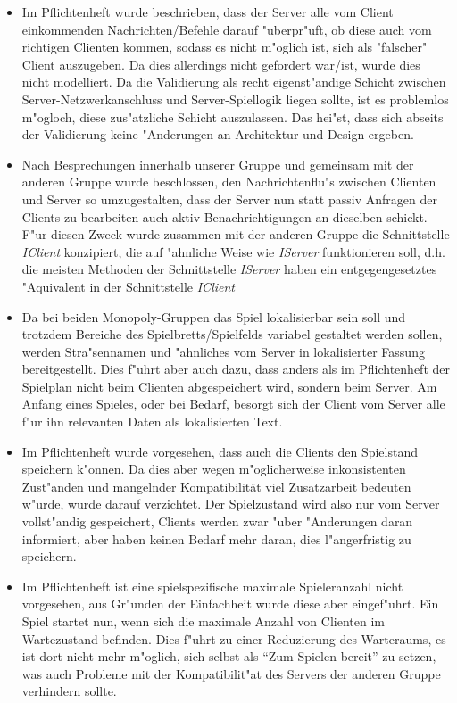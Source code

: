 \documentclass[a4paper,10pt]{article}
\begin{document}
\begin{itemize}
\item Im Pflichtenheft wurde beschrieben, dass der Server alle vom Client einkommenden Nachrichten/Befehle darauf "uberpr"uft, ob diese auch vom richtigen Clienten kommen, sodass es nicht m"oglich ist, sich als "falscher" Client auszugeben. Da dies allerdings nicht gefordert war/ist, wurde dies nicht modelliert. Da die Validierung als recht eigenst"andige Schicht zwischen Server-Netzwerkanschluss und Server-Spiellogik liegen sollte, ist es problemlos m"ogloch, diese zus"atzliche Schicht auszulassen. Das hei"st, dass sich abseits der Validierung keine "Anderungen an Architektur und Design ergeben.
\item Nach Besprechungen innerhalb unserer Gruppe und gemeinsam mit der anderen Gruppe wurde beschlossen, den Nachrichtenflu"s zwischen Clienten und Server so umzugestalten, dass der Server nun statt passiv Anfragen der Clients zu bearbeiten auch aktiv Benachrichtigungen an dieselben schickt. F"ur diesen Zweck wurde zusammen mit der anderen Gruppe die Schnittstelle \textit{IClient} konzipiert, die auf "ahnliche Weise wie \textit{IServer} funktionieren soll, d.h. die meisten Methoden der Schnittstelle \textit{IServer} haben ein entgegengesetztes "Aquivalent in der Schnittstelle \textit{IClient}
\item Da bei beiden Monopoly-Gruppen das Spiel lokalisierbar sein soll und trotzdem Bereiche des Spielbretts/Spielfelds variabel gestaltet werden sollen, werden Stra"sennamen und "ahnliches vom Server in lokalisierter Fassung bereitgestellt. Dies f"uhrt aber auch dazu, dass anders als im Pflichtenheft der Spielplan nicht beim Clienten abgespeichert wird, sondern beim Server. Am Anfang eines Spieles, oder bei Bedarf, besorgt sich der Client vom Server alle f"ur ihn relevanten Daten als lokalisierten Text.
\item Im Pflichtenheft wurde vorgesehen, dass auch die Clients den Spielstand speichern k"onnen. Da dies aber wegen m"oglicherweise inkonsistenten Zust"anden und mangelnder Kompatibilität viel Zusatzarbeit bedeuten w"urde, wurde darauf verzichtet. Der Spielzustand wird also nur vom Server vollst"andig gespeichert, Clients werden zwar "uber "Anderungen daran informiert, aber haben keinen Bedarf mehr daran, dies l"angerfristig zu speichern.
\item Im Pflichtenheft ist eine spielspezifische maximale Spieleranzahl nicht vorgesehen, aus Gr"unden der Einfachheit wurde diese aber eingef"uhrt. Ein Spiel startet nun, wenn sich die maximale Anzahl von Clienten im Wartezustand befinden. Dies f"uhrt zu einer Reduzierung des Warteraums, es ist dort nicht mehr m"oglich, sich selbst als "`Zum Spielen bereit"' zu setzen, was auch Probleme mit der Kompatibilit"at des Servers der anderen Gruppe verhindern sollte.

\end{itemize}
\end{document}
